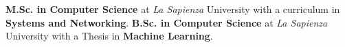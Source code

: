 

\begin{scholarship}
  {\textbf{M.Sc. in Computer Science} at \textit{La Sapienza} University with a curriculum in \textbf{Systems and Networking}. }
  \emptySeparator
  {\textbf{B.Sc. in Computer Science} at \textit{La Sapienza} University with a Thesis in \textbf{Machine Learning}. \newline  {}}
 
\end{scholarship}
